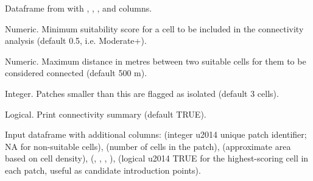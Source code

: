 \documentclass[a4paper]{book}
\begin{document}
%
\begin{Arguments}
\begin{ldescription}
\item[\code{result}] Dataframe from  with , ,
, and  columns.

\item[\code{min\_suitability}] Numeric. Minimum suitability score for a cell to be
included in the connectivity analysis (default 0.5, i.e. Moderate+).

\item[\code{gap\_m}] Numeric. Maximum distance in metres between two suitable cells
for them to be considered connected (default 500 m).

\item[\code{min\_patch\_cells}] Integer. Patches smaller than this are flagged as
isolated (default 3 cells).

\item[\code{verbose}] Logical. Print connectivity summary (default TRUE).
\end{ldescription}
\end{Arguments}
%
\begin{Value}
Input dataframe with additional columns:
 (integer \bsl{}u2014 unique patch identifier; NA for non-suitable cells),
 (number of cells in the patch),
 (approximate area based on cell density),
 (, , , ),
 (logical \bsl{}u2014 TRUE for the highest-scoring cell in each patch,
useful as candidate introduction points).
\end{Value}
%
\begin{Examples}
\end{Examples}
\end{document}
